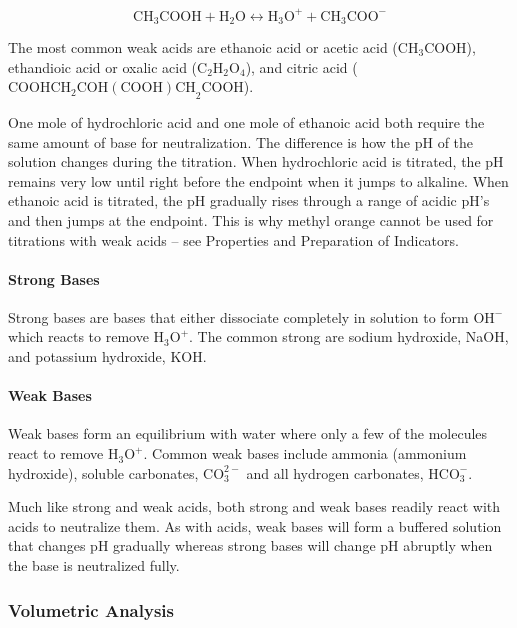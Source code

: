 \[ \mathrm{CH}_3\mathrm{COOH} + \mathrm{H}_2\mathrm{O} \longleftrightarrow \mathrm{H}_3 \mathrm{O}^{+} + \mathrm{CH}_3\mathrm{COO}^{-} \]

The most common weak acids are ethanoic acid or acetic acid ($\mathrm{CH}_3\mathrm{COOH}$), ethandioic acid or oxalic acid ($\mathrm{C}_2\mathrm{H}_2\mathrm{O}_4$), and citric acid ($\mathrm{COOHCH}_2\mathrm{COH(COOH)CH}_2\mathrm{COOH}$).

One mole of hydrochloric acid and one mole of ethanoic acid both require the same amount of base for neutralization. The difference is how the pH of the solution changes during the titration. When hydrochloric acid is titrated, the pH remains very low until right before the endpoint when it jumps to alkaline. When ethanoic acid is titrated, the pH gradually rises through a range of acidic pH's and then jumps at the endpoint. This is why methyl orange cannot be used for titrations with weak acids – see Properties and Preparation of Indicators.

\paragraph{Strong Bases}

Strong bases are bases that either dissociate completely in solution to form $\mathrm{OH}^{-}$ which reacts to remove $\mathrm{H}_3\mathrm{O}^{+}$. The common strong are sodium hydroxide, NaOH, and potassium hydroxide, KOH.

\paragraph{Weak Bases}

Weak bases form an equilibrium with water where only a few of the molecules react to remove $\mathrm{H}_3\mathrm{O}^{+}$. Common weak bases include ammonia (ammonium hydroxide), soluble carbonates, $\mathrm{CO}_3^{2-}$ and all hydrogen carbonates, $\mathrm{HCO}_3^{-}$.

Much like strong and weak acids, both strong and weak bases readily react with acids to neutralize them. As with acids, weak bases will form a buffered solution that changes pH gradually whereas strong bases will change pH abruptly when the base is neutralized fully.

\subsubsection{Volumetric Analysis}

